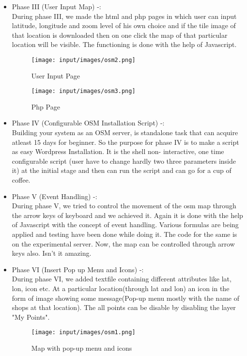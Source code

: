 \begin{itemize}
\begin{itemize}
\item Phase III (User Input Map) -: \\
        During phase III, we made the html and php pages in which user can input latitude, longitude and zoom level of his own choice and if the tile image of that location is downloaded then on one click the map of that particular location will be visible. The functioning is done with the help of Javascript.
\begin{figure}[ht]
\centering \texttt{[image: input/images/osm2.png]}
\caption{User Input Page}
\end{figure}

\begin{figure}[ht]
\centering \texttt{[image: input/images/osm3.png]}
\caption{Php Page}
\end{figure}

\item Phase IV (Configurable OSM Installation Script) -: \\
	Building your system as an OSM server, is standalone task that can acquire atleast 15 days for beginner. So the purpose for phase IV is to make a script as easy Wordpress Installation. It is the shell non- interactive, one time configurable script (user have to change hardly two three parameters inside it) at the initial stage and then can run the script and can go for a cup of coffee.

\item Phase V (Event Handling) -: \\
During phase V, we tried to control the movement of the osm map through the arrow keys of keyboard and we achieved it. Again it is done with the help of Javascript with the concept of event handling. Various formulas are being applied and testing have been done while doing it. The code for the same is on the experimental server. Now, the map can be controlled through arrow keys also. Isn't it amazing. 

\item Phase VI (Insert Pop up Menu and Icons) -: \\
During phase VI, we added textfile containing different attributes like lat, lon, icon etc. At a particular location(through lat and lon) an icon in the form of image showing some message(Pop-up menu mostly with the name of shops at that location). The all points can be disable by disabling the layer "My Points". 
\begin{figure}[ht]
\centering \texttt{[image: input/images/osm1.png]}
\caption{Map with pop-up menu and icons}
\end{figure}


\end{itemize}
\end{itemize}
